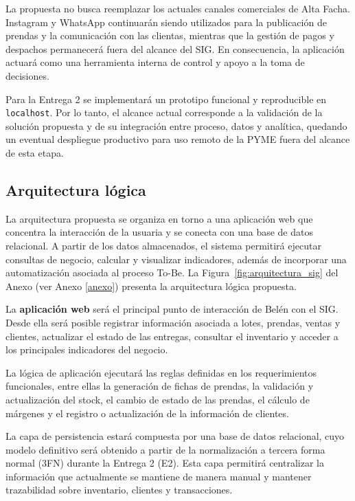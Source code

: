 \documentclass[11pt,letterpaper]{article}
\begin{document}
La propuesta no busca reemplazar los actuales canales comerciales de Alta Facha. 
Instagram y WhatsApp continuarán siendo utilizados para la publicación de prendas y la 
comunicación con las clientas, mientras que la gestión de pagos y despachos permanecerá 
fuera del alcance del SIG. En consecuencia, la aplicación actuará como una herramienta 
interna de control y apoyo a la toma de decisiones.

Para la Entrega 2 se implementará un prototipo funcional y reproducible en 
\texttt{localhost}. Por lo tanto, el alcance actual corresponde a la validación de la 
solución propuesta y de su integración entre proceso, datos y analítica, quedando un 
eventual despliegue productivo para uso remoto de la PYME fuera del alcance de esta etapa.


\subsection*{Arquitectura lógica}

La arquitectura propuesta se organiza en torno a una aplicación web que concentra la 
interacción de la usuaria y se conecta con una base de datos relacional. A partir de los 
datos almacenados, el sistema permitirá ejecutar consultas de negocio, calcular y 
visualizar indicadores, además de incorporar una automatización asociada al proceso 
To-Be. La Figura~\ref{fig:arquitectura_sig} del Anexo (ver Anexo \ref{anexo}) presenta la arquitectura lógica propuesta.

La \textbf{aplicación web} será el principal punto de interacción de Belén con el 
SIG. Desde ella será posible registrar información asociada a lotes, prendas, ventas y 
clientes, actualizar el estado de las entregas, consultar el inventario y acceder a los 
principales indicadores del negocio.

La lógica de aplicación ejecutará las reglas definidas en los requerimientos 
funcionales, entre ellas la generación de fichas de prendas, la validación y actualización 
del stock, el cambio de estado de las prendas, el cálculo de márgenes y el registro o 
actualización de la información de clientes.

La capa de persistencia estará compuesta por una base de datos relacional, cuyo 
modelo definitivo será obtenido a partir de la normalización a tercera forma normal 
(3FN) durante la Entrega 2 (E2). Esta capa permitirá centralizar la información que 
actualmente se mantiene de manera manual y mantener trazabilidad sobre inventario, 
clientes y transacciones.
\end{document}
